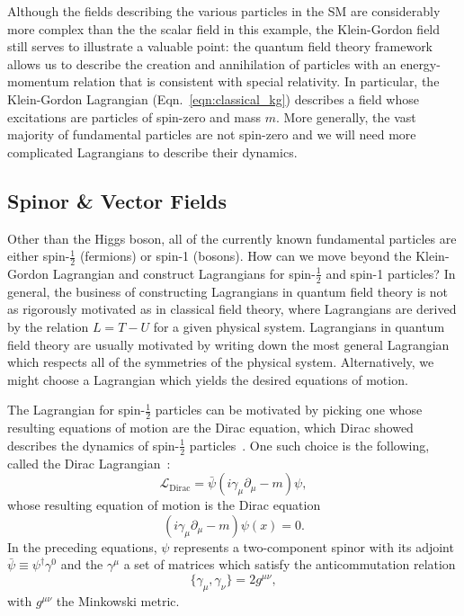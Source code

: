 Although the fields describing the various particles in the SM are considerably more complex than the the scalar field in this example, the Klein-Gordon field still serves to illustrate a valuable point: the quantum field theory framework allows us to describe the creation and annihilation of particles with an energy-momentum relation that is consistent with special relativity.
In particular, the Klein-Gordon Lagrangian (Eqn.~\ref{eqn:classical_kg}) describes a field whose excitations are particles of spin-zero and mass $m$.
More generally, the vast majority of fundamental particles are not spin-zero and we will need more complicated Lagrangians to describe their dynamics.

\subsection{Spinor \& Vector Fields} \label{sec:theory_sv_fields}
Other than the Higgs boson, all of the currently known fundamental particles are either spin-$\frac{1}{2}$ (fermions) or spin-1 (bosons).
How can we move beyond the Klein-Gordon Lagrangian and construct Lagrangians for spin-$\frac{1}{2}$ and spin-1 particles?
In general, the business of constructing Lagrangians in quantum field theory is not as rigorously motivated as in classical field theory, where Lagrangians are derived by the relation $L = T - U$ for a given physical system.
Lagrangians in quantum field theory are usually motivated by writing down the most general Lagrangian which respects all of the symmetries of the physical system.
Alternatively, we might choose a Lagrangian which yields the desired equations of motion.

The Lagrangian for spin-$\frac{1}{2}$ particles can be motivated by picking one whose resulting equations of motion are the Dirac equation, which Dirac showed describes the dynamics of spin-$\frac{1}{2}$ particles~\cite{Dirac:1928hu}.
One such choice is the following, called the Dirac Lagrangian~\cite{Peskin:1995ev}:
\begin{equation} \label{eqn:dirac_lagrangian}
    \mathcal L_{\text{Dirac}} = \bar{\psi}(i \gamma_\mu \partial_\mu - m) \psi,
\end{equation}
whose resulting equation of motion is the Dirac equation
\begin{equation}
    (i \gamma_\mu \partial_\mu - m) \psi(x) = 0.
\end{equation}
In the preceding equations, $\psi$ represents a two-component spinor with its adjoint $\bar{\psi} \equiv \psi^\dagger\gamma^0$ and the $\gamma^\mu$ a set of matrices which satisfy the anticommutation relation
\begin{equation}
    \{\gamma_\mu, \gamma_\nu\} = 2 g^{\mu\nu},
\end{equation}
with $g^{\mu\nu}$ the Minkowski metric. 


